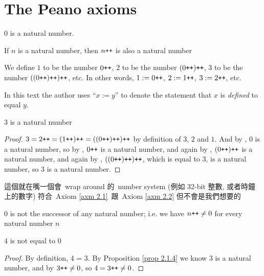 \section{The Peano axioms}\label{sec 2.1}

\begin{axiom}\label{axm 2.1}
\( 0 \) is a natural number.
\end{axiom}
\begin{axiom}\label{axm 2.2}
If \( n \) is a natural number, then \( n\texttt{++} \) is also a natural number
\end{axiom}

\setcounter{theorem}{2}
\begin{definition}\label{def 2.1.3}
We define \( 1 \) to be the number \( 0\texttt{++} \), \(2\) to be the number \( (0\texttt{++})\texttt{++} \), 3 to be the number \( ((0\texttt{++})\texttt{++})\texttt{++} \), etc. In other words, \( 1 := 0\texttt{++} \), \( 2 := 1\texttt{++} \), \( 3 := 2\texttt{++} \), etc.
\end{definition}

\begin{note}
In this text the author uses ``\(x := y\)'' to denote the statement that \(x\) is \emph{defined} to equal \(y\).
\end{note}

\begin{proposition}\label{prop 2.1.4}
3 is a natural number
\end{proposition}
\begin{proof}
\( 3 = 2\texttt{++} = (1\texttt{++})\texttt{++} = ((0\texttt{++})\texttt{++})\texttt{++} \) by definition of \(3\), \(2\) and \(1\). And by , \(0\) is a natural number, so by , \(0\texttt{++}\) is a natural number, and again by , \((0\texttt{++})\texttt{++}\) is a natural number, and again by , \( ((0\texttt{++})\texttt{++})\texttt{++} \), which is equal to \(3\), is a natural number, so \(3\) is a natural number.
\end{proof}

\begin{example}\label{example 2.1.5}
這個就在嘴一個會\ wrap around 的\ number system (例如 32-bit 整數, 或者時鐘上的數字) 符合\ Axiom \ref{axm 2.1}\ 跟\ Axiom \ref{axm 2.2} 但不會是我們想要的
\end{example}

\begin{axiom}\label{axm 2.3}
\(0\) is not the successor of any natural number; i.e. we have \(n\texttt{++} \neq 0\) for every natural number \(n\)
\end{axiom}

\begin{proposition}\label{prop 2.1.6}
\(4\) is not equal to \(0\)
\end{proposition}
\begin{proof}
By definition, 4 = 3\INC. By Proposition \ref{prop 2.1.4} we know 3 is a natural number, and by  \(3\texttt{++} \neq 0\), so \(4 = 3\texttt{++} \neq 0\).
\end{proof}

